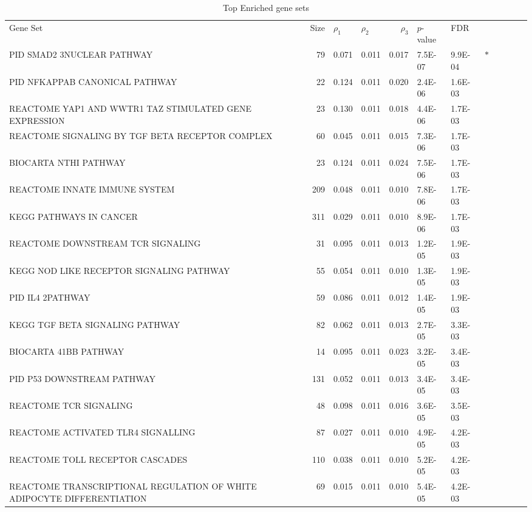 \documentclass[11pt, a4paper]{article}
\begin{document}
	
	
		{\scriptsize \begin{longtable}{p{3in}rp{0.5in}p{0.5in}rp{0.5in}p{0.5in}rp{0.5in}p{0.5in}lp{0.1in}}
				\label{table:top30} \\
				\caption{Top Enriched gene sets} \\
				\hline
				\hline
				Gene Set & Size & $\rho_1$ & $\rho_2$ & $\rho_3$ & $p$-value & FDR & \\ 
				\hline
		PID SMAD2 3NUCLEAR PATHWAY & 79 & 0.071 & 0.011 & 0.017 & 7.5E-07 & 9.9E-04 & $\ast$ \\ 
		PID NFKAPPAB CANONICAL PATHWAY & 22 & 0.124 & 0.011 & 0.020 & 2.4E-06 & 1.6E-03 &  \\ 
		REACTOME YAP1 AND WWTR1 TAZ STIMULATED GENE EXPRESSION & 23 & 0.130 & 0.011 & 0.018 & 4.4E-06 & 1.7E-03 &  \\ 
		REACTOME SIGNALING BY TGF BETA RECEPTOR COMPLEX & 60 & 0.045 & 0.011 & 0.015 & 7.3E-06 & 1.7E-03 &  \\ 
		BIOCARTA NTHI PATHWAY & 23 & 0.124 & 0.011 & 0.024 & 7.5E-06 & 1.7E-03 &  \\ 
		REACTOME INNATE IMMUNE SYSTEM & 209 & 0.048 & 0.011 & 0.010 & 7.8E-06 & 1.7E-03 &  \\ 
		KEGG PATHWAYS IN CANCER & 311 & 0.029 & 0.011 & 0.010 & 8.9E-06 & 1.7E-03 &  \\ 
		REACTOME DOWNSTREAM TCR SIGNALING & 31 & 0.095 & 0.011 & 0.013 & 1.2E-05 & 1.9E-03 &  \\ 
		KEGG NOD LIKE RECEPTOR SIGNALING PATHWAY & 55 & 0.054 & 0.011 & 0.010 & 1.3E-05 & 1.9E-03 &  \\ 
		PID IL4 2PATHWAY & 59 & 0.086 & 0.011 & 0.012 & 1.4E-05 & 1.9E-03 &  \\ 
		KEGG TGF BETA SIGNALING PATHWAY & 82 & 0.062 & 0.011 & 0.013 & 2.7E-05 & 3.3E-03 &  \\ 
		BIOCARTA 41BB PATHWAY & 14 & 0.095 & 0.011 & 0.023 & 3.2E-05 & 3.4E-03 &  \\ 
		PID P53 DOWNSTREAM PATHWAY & 131 & 0.052 & 0.011 & 0.013 & 3.4E-05 & 3.4E-03 &  \\ 
		REACTOME TCR SIGNALING & 48 & 0.098 & 0.011 & 0.016 & 3.6E-05 & 3.5E-03 &  \\ 
		REACTOME ACTIVATED TLR4 SIGNALLING & 87 & 0.027 & 0.011 & 0.010 & 4.9E-05 & 4.2E-03 &  \\ 
		REACTOME TOLL RECEPTOR CASCADES & 110 & 0.038 & 0.011 & 0.010 & 5.2E-05 & 4.2E-03 &  \\ 
		REACTOME TRANSCRIPTIONAL REGULATION OF WHITE ADIPOCYTE DIFFERENTIATION & 69 & 0.015 & 0.011 & 0.010 & 5.4E-05 & 4.2E-03 &  \\ 

\end{longtable}}
\end{document}
